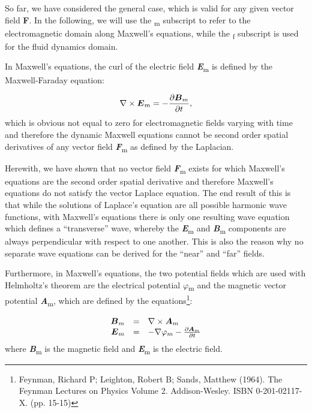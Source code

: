\documentclass[a4paper]{article}
\newcommand\textstyleNone[1]{#1}
\newcommand\boldsubformula[1]{\text{\mathversion{bold}$#1$}}
\begin{document}
{
\textstyleNone{So far, we have considered the general case, which is valid for any given vector field \textbf{F}. In the
following, we will use the \textsubscript{m} subscript to refer to the electromagnetic domain along Maxwell's
equations, while the \textsubscript{f} subscript is used for the fluid dynamics domain. }}

{
\textstyleNone{In Maxwell's equations, the curl of the electric field \textbf{\textit{E}}\textsubscript{m} is defined by
{the Maxwell-Faraday equation}:}}

\begin{equation}
\nabla \times \boldsubformula E_m=-\frac{\partial \boldsubformula B_m}{\partial t},
\end{equation}
{
\textstyleNone{which is obvious not equal to zero for electromagnetic fields varying with time and therefore the dynamic
Maxwell equations cannot be second order spatial derivatives of any vector field \textbf{\textit{F}}\textsubscript{m}
as defined by the Laplacian. }}

{
\textstyleNone{Herewith, we have shown that no vector field \textbf{\textit{F}}\textsubscript{m} exists for which
Maxwell's equations are the second order spatial derivative and therefore Maxwell's equations do not satisfy the vector
Laplace equation. The end result of this is that while the solutions of Laplace's equation are all possible harmonic
wave functions, with Maxwell's equations there is only one resulting wave equation which defines a ``transverse'' wave,
whereby the \textbf{\textit{E}}\textsubscript{m} {and
}\textbf{\textit{{B}}}{\textsubscript{m}}{
components are always perpendicular with respect to one another. This is also the reason why no separate wave equations
can be derived for the ``near'' and ``far'' fields.}}}

{
\textstyleNone{{Furthermore, in Maxwell's equations, the two
potential fields which are used with Helmholtz's theorem are the electrical potential
}{$\varphi
$}{\textsubscript{m}}{
and the magnetic vector potential
}\textbf{\textit{{A}}}{\textsubscript{m}}{,
which are defined by the equations}}\footnote{ Feynman, Richard P; Leighton, Robert B; Sands, Matthew (1964). The
Feynman Lectures on Physics Volume 2. Addison-Wesley. ISBN 0-201-02117-X. (pp. 15-15)\par
}\textstyleNone{{:}}}

\begin{equation}
\begin{matrix}\hfill \boldsubformula B_m&=&\nabla \times \boldsubformula A_m\hfill\null \\\hfill \boldsubformula
E_m&=&-\nabla \varphi _m-\frac{\partial \boldsubformula A_m}{\partial t}\hfill\null \end{matrix}
\end{equation}
{
\textstyleNone{{where
}\textbf{\textit{{B}}}{\textsubscript{m}}{
is the magnetic field and
}\textbf{\textit{{E}}}{\textsubscript{m}}{
is the electric field.}}}
\end{document}
